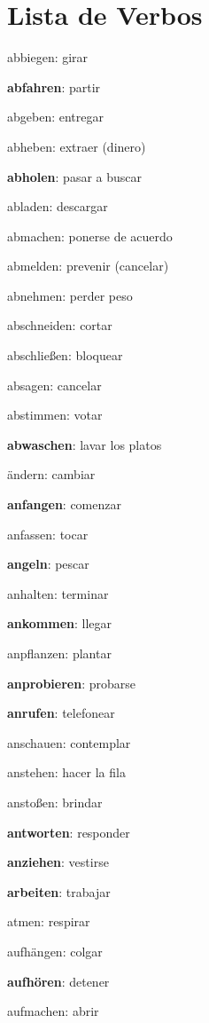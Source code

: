 \clearpage

\section{Lista de Verbos}
\begin{multicols}{2}
\begin{myitemize}
\item abbiegen: girar
\item \textbf{abfahren}: partir
\item abgeben: entregar
\item abheben: extraer (dinero)
\item \textbf{abholen}: pasar a buscar
\item abladen: descargar
\item abmachen: ponerse de acuerdo
\item abmelden: prevenir (cancelar)
\item abnehmen: perder peso
\item abschneiden: cortar
\item abschließen: bloquear
\item absagen: cancelar
\item abstimmen: votar
\item \textbf{abwaschen}: lavar los platos
\item ändern: cambiar
\item \textbf{anfangen}: comenzar
\item anfassen: tocar
\item \textbf{angeln}: pescar
\item anhalten: terminar
\item \textbf{ankommen}: llegar
\item anpflanzen: plantar
\item \textbf{anprobieren}: probarse
\item \textbf{anrufen}: telefonear
\item anschauen: contemplar
\item anstehen: hacer la fila
\item anstoßen: brindar
\item \textbf{antworten}: responder
\item \textbf{anziehen}: vestirse
\item \textbf{arbeiten}: trabajar
\item atmen: respirar
\item aufhängen: colgar
\item \textbf{aufhören}: detener
\item aufmachen: abrir

\end{myitemize}
\end{multicols}

